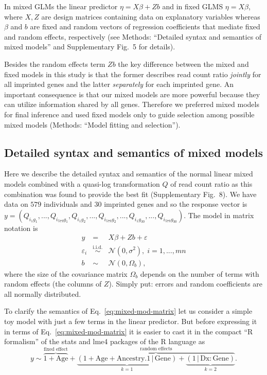 \documentclass[letterpaper]{article}
\begin{document}
In mixed GLMs the linear predictor \(\eta = X \beta + Z b\) and in fixed GLMS
\(\eta = X \beta\), where \(X, Z\) are design matrices containing data on
explanatory variables whereas \(\beta \) and \(b\) are fixed and random
vectors of regression coefficients that mediate fixed and random effects,
respectively (see Methods: ``Detailed syntax and semantics of mixed models''
and Supplementary Fig.~5 for details).

Besides the random effects term \(Zb\) the key difference between
the mixed and fixed models in this study is that the former describes
read count ratio \emph{jointly} for all imprinted genes and the latter
\emph{separately} for each imprinted gene.  An important consequence is that
our mixed models are more powerful because they can utilize 
information shared by all genes.  Therefore we preferred mixed models for final
inference and used fixed models only to guide selection among possible mixed
models (Methods: ``Model fitting and selection'').

\subsection*{Detailed syntax and semantics of mixed models}
\label{sec:mixed-mod}

Here we describe the detailed syntax and semantics of the normal linear mixed
models combined with a quasi-log transformation \(Q\) of read count ratio as
this combination was found to provide the best fit
(Supplementary Fig.~8).  We have data
on \(579\) individuals and \(30\) imprinted genes and so the response vector is
\(y=(Q_{i_1g_1},...,Q_{i_{579}g_1},Q_{i_1g_2},...,Q_{i_{579}g_2},...,Q_{i_1g_{30}},...,Q_{i_{579}g_{30}})\).
The model in matrix notation is
\begin{eqnarray}
\label{eq:mixed-mod-matrix}
y &=& X \beta + Z b + \varepsilon \\
\varepsilon_i &\overset{\text{i.i.d.}}{\sim}& \mathcal{N}(0, \sigma^2),\;
i=1,...,mn \\
b &\sim& \mathcal{N}(0, \Omega_b),
\end{eqnarray}
where the size of the covariance matrix \(\Omega_b\) depends on the number of
terms with random effects (the columns of \(Z\)).  Simply put: errors and
random coefficients are all normally distributed.

To clarify the semantics of Eq.~\ref{eq:mixed-mod-matrix} let us consider a
simple toy model with just a few terms in the linear predictor.  But before
expressing it in terms of Eq.~\ref{eq:mixed-mod-matrix} it is easier
to cast it in the compact ``R formalism'' of the stats and lme4 packages of the R
language as
\begin{equation}
\label{eq:toy-mod-r}
y \sim \overbrace{1 + \mathrm{Age}}^{\text{fixed effect}} +
\overbrace{\underbrace{(1 + \mathrm{Age} + \mathrm{Ancestry.1} \,|\,
\mathrm{Gene})}_{k=1} +
\underbrace{(1 \,|\, \mathrm{Dx}:\mathrm{Gene})}_{k=2}}^{\text{random
effects}}.
\end{equation}
\end{document}
